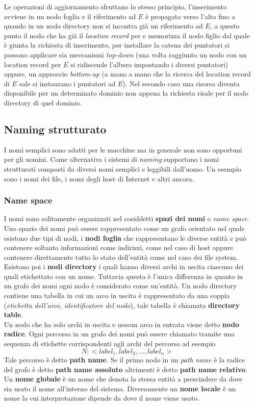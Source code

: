 Le operazioni di aggiornamento sfruttano lo stesso principio, l'inserimento avviene in un nodo foglia e il riferimento ad $E$ è propagato verso l'alto fino a quando in un nodo directory non si incontra già un riferimento ad $E$, a questo punto il nodo che ha già il \emph{location record} per e memorizza il nodo figlio dal quale è giunta la richiesta di inserimento, per installare la catena dei puntatori si possono applicare sia meccanismi \emph{top-down} (una volta raggiunto un nodo con un location record per $E$ si ridiscende l'albero impostando i diversi puntatori) oppure, un approccio \emph{bottom-up} (a mano a mano che la ricerca del location record di $E$ sale si instaurano i puntatori ad $E$). Nel secondo caso una risorsa diventa disponibile per un determinato dominio non appena la richiesta risale per il nodo directory di quel dominio.
\subsection{Naming strutturato}
I nomi semplici sono adatti per le macchine ma in generale non sono opportuni per gli uomini. Come alternativa i sistemi di \emph{naming} supportano i nomi strutturati composti da diversi nomi semplici e leggibili dall'uomo. Un esempio sono i nomi dei file, i nomi degli host di Internet e altri ancora.
\subsubsection{Name space}
I nomi sono solitamente organizzati nel cosiddetti \textbf{spazi dei nomi} o \emph{name space}. Uno spazio dei nomi può essere rappresentato come un grafo orientato nel quale esistono due tipi di nodi, i \textbf{nodi foglia} che rappresentano le diverse entità e può contenere soltanto informazioni come indirizzi, come nel caso di host oppure contenere direttamente tutto lo stato dell'entità come nel caso dei file system.\\
Esistono poi i \textbf{nodi directory} i quali hanno diversi archi in uscita ciascuno dei quali etichettato con un nome. Tuttavia questa è l'unica differenza in quanto in un grafo dei nomi ogni nodo è considerato come un'entità. Un nodo directory contiene una tabella in cui un arco in uscita è rappresentato da una coppia (\emph{etichetta dell'arco, identificatore del nodo}), tale tabella è chiamata \textbf{directory table}.\\
Un nodo che ha solo archi in uscita e nessun arco in entrata viene detto \textbf{nodo radice}. Ogni percorso in un grafo dei nomi può essere chiamato tramite una sequenza di etichette corrispondenti agli archi del percorso ad esempio
$$N:<label_1, label_2, \dots, label_n>$$
Tale percorso è detto \textbf{path name}. Se il primo nodo in un \emph{path name} è la radice del grafo è detto \textbf{path name assoluto} altrimenti è detto \textbf{path name relativo}.\\
Un \textbf{nome globale} è un nome che denota la stessa entità a prescindere da dove sia usato il nome all'interno del sistema. Diversamente un \textbf{nome locale} è un nome la cui interpretazione dipende da dove il nome viene usato. 
